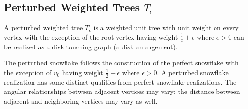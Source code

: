 \subsection{Perturbed Weighted Trees $T_\epsilon$}

A perturbed weighted tree $T_\epsilon$ is a weighted unit tree with unit weight on every vertex with the exception of the root vertex having weight $\frac{1}{2}+\epsilon$ where $\epsilon>0$ can be realized as a disk touching graph (a disk arrangement).  

The perturbed snowflake follows the construction of the perfect snowflake with the exception of $v_0$ having weight $\frac{1}{2} + \epsilon$ where $\epsilon > 0$.
A perturbed snowflake realization has some distinct qualities from perfect snowflake realizations.  
The angular relationships between adjacent vertices may vary; the distance between adjacent and neighboring vertices may vary as well.


